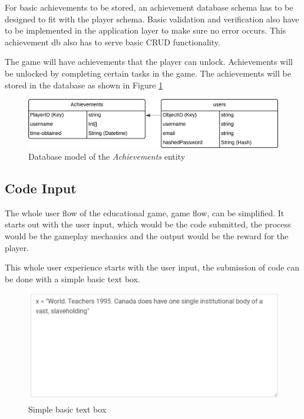For basic achievements to be stored, an achievement database schema has to be designed to fit with the player schema. Basic validation and verification also have to be implemented in the application layer to make sure no error occurs. This achievement db also has to serve basic CRUD functionality.


The game will have achievements that the player can unlock. Achievements will be unlocked by completing certain tasks in the game. The achievements will be stored in the database as shown in Figure \ref{fig:achievements_object}
\begin{figure}[H]
    \centering
    \includegraphics[width=0.5\linewidth]{images/achievements_object.png}
    \caption{Database model of the \textit{Achievements} entity}    
    \label{fig:achievements_object}
\end{figure}

\subsection{Code Input}
The whole user flow of the educational game, game flow\cite{kramarzewski2018practical}, can be simplified. It starts out with the user input, which would be the code submitted, the process would be the gameplay mechanics and the output would be the reward for the player.

This whole user experience starts with the user input, the submission of code can be done with a simple basic text box.
\begin{figure}[H]
    \centering
    \includegraphics[width=0.5\linewidth]{images/textbox.png}
    \caption{Simple basic text box}
\end{figure}

